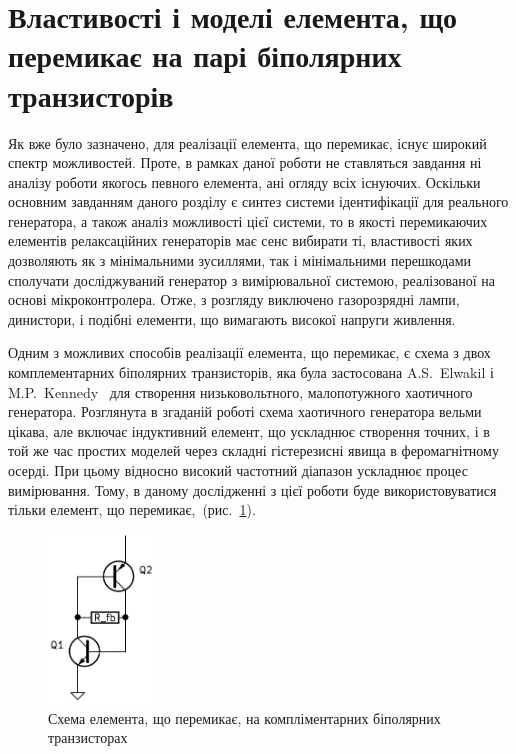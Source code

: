 \section{Властивості і моделі елемента, що перемикає на парі біполярних транзисторів}
\label{atu:sec:relax3d_sw}

Як вже було зазначено, для реалізації
елемента, що перемикає, існує широкий спектр
можливостей. Проте, в рамках даної роботи не ставляться завдання
ні аналізу роботи якогось певного елемента, ані огляду всіх
існуючих. Оскільки основним завданням даного розділу є синтез
системи ідентифікації для реального генератора, а також аналіз
можливості цієї системи, то в якості перемикаючих елементів
релаксаційних генераторів має сенс вибирати ті, властивості
яких дозволяють як з мінімальними зусиллями, так і мінімальними
перешкодами сполучати досліджуваний генератор з вимірювальної
системою, реалізованої на основі мікроконтролера. Отже, з
розгляду виключено газорозрядні лампи, динистори, і подібні
елементи, що вимагають високої напруги живлення.


Одним з можливих способів реалізації
елемента, що перемикає, є схема з двох комплементарних біполярних
транзисторів, яка була застосована A.S.~Elwakil і M.P.~Kennedy~\cite{kennedy1999} для
створення низьковольтного, малопотужного хаотичного
генератора. Розглянута в згаданій роботі схема хаотичного
генератора вельми цікава, але включає індуктивний елемент,
що ускладнює створення точних, і в той же час простих
моделей через складні гістерезисні
явища в феромагнітному осерді. При цьому відносно високий
частотний діапазон ускладнює процес вимірювання. Тому,
в даному дослідженні з цієї роботи буде використовуватися
тільки елемент, що перемикає,~(рис.~\ref{atu:f:relax3d_switch}).

\begin{figure}[htb!]
  \centerline{\includegraphics[width=0.25\textwidth]{p/relax3d_switch.png} }
\caption{Схема елемента, що перемикає, на компліментарних біполярних транзисторах}
\label{atu:f:relax3d_switch}
\end{figure}



